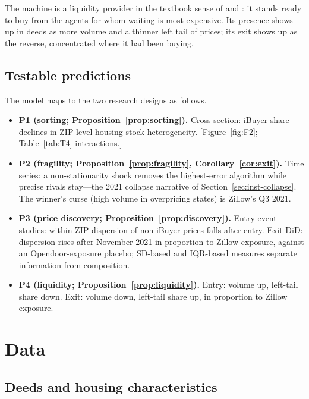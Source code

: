 \documentclass[12pt, letterpaper]{article}
\theoremstyle{remark}
\begin{document}
The machine is a liquidity provider in the textbook sense of \citet{duffie2005otc} and \citet{weill2007leaning}: it stands ready to buy from the agents for whom waiting is most expensive. Its presence shows up in deeds as more volume and a thinner left tail of prices; its exit shows up as the reverse, concentrated where it had been buying.

\subsection{Testable predictions}\label{sec:model-predictions}

The model maps to the two research designs as follows.

\begin{itemize}
\item \textbf{P1 (sorting; Proposition~\ref{prop:sorting}).} Cross-section: iBuyer share declines in ZIP-level housing-stock heterogeneity. [Figure~\ref{fig:F2}; Table~\ref{tab:T4} interactions.]
\item \textbf{P2 (fragility; Proposition~\ref{prop:fragility}, Corollary~\ref{cor:exit}).} Time series: a non-stationarity shock removes the highest-error algorithm while precise rivals stay---the 2021 collapse narrative of Section~\ref{sec:inst-collapse}. The winner's curse (high volume in overpricing states) is Zillow's Q3 2021.
\item \textbf{P3 (price discovery; Proposition~\ref{prop:discovery}).} Entry event studies: within-ZIP dispersion of non-iBuyer prices falls after entry. Exit DiD: dispersion rises after November 2021 in proportion to Zillow exposure, against an Opendoor-exposure placebo; SD-based and IQR-based measures separate information from composition.
\item \textbf{P4 (liquidity; Proposition~\ref{prop:liquidity}).} Entry: volume up, left-tail share down. Exit: volume down, left-tail share up, in proportion to Zillow exposure.
\end{itemize}

\section{Data}\label{sec:data}

\subsection{Deeds and housing characteristics}\label{sec:data-deeds}
\end{document}
